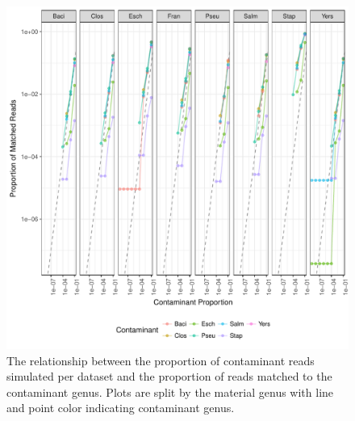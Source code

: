 \documentclass[fleqn,10pt,lineno]{wlpeerj}\usepackage[]{graphicx}\usepackage[]{color}
\makeatletter
\def\maxwidth{ %
  \ifdim\Gin@nat@width>\linewidth
    \linewidth
  \else
    \Gin@nat@width
  \fi
}
\newenvironment{knitrout}{}{} %
\makeatother
\begin{document}
\begin{knitrout}
\color{fgcolor}\begin{figure}
\includegraphics[width=\maxwidth]{figure/contam_fig-1} \caption[The relationship between the proportion of contaminant reads simulated per dataset and the proportion of reads matched to the contaminant genus]{The relationship between the proportion of contaminant reads simulated per dataset and the proportion of reads matched to the contaminant genus. Plots are split by the material genus with line and point color indicating contaminant genus.}\label{fig:contam_fig}
\end{figure}


\end{knitrout}

\end{document}
